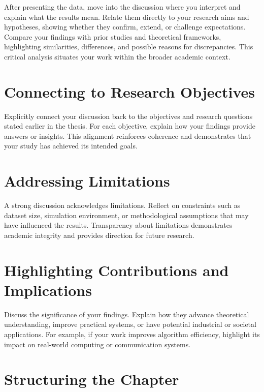 After presenting the data, move into the discussion where you interpret and explain what the results mean. Relate them directly to your research aims and hypotheses, showing whether they confirm, extend, or challenge expectations. Compare your findings with prior studies and theoretical frameworks, highlighting similarities, differences, and possible reasons for discrepancies. This critical analysis situates your work within the broader academic context.

\section{Connecting to Research Objectives}
\label{sec:connecting-objectives}

Explicitly connect your discussion back to the objectives and research questions stated earlier in the thesis. For each objective, explain how your findings provide answers or insights. This alignment reinforces coherence and demonstrates that your study has achieved its intended goals.

\section{Addressing Limitations}
\label{sec:addressing-limitations}

A strong discussion acknowledges limitations. Reflect on constraints such as dataset size, simulation environment, or methodological assumptions that may have influenced the results. Transparency about limitations demonstrates academic integrity and provides direction for future research.

\section{Highlighting Contributions and Implications}
\label{sec:ch4-highlighting-contributions}

Discuss the significance of your findings. Explain how they advance theoretical understanding, improve practical systems, or have potential industrial or societal applications. For example, if your work improves algorithm efficiency, highlight its impact on real-world computing or communication systems.

\section{Structuring the Chapter}
\label{sec:structuring-results-chapter}

